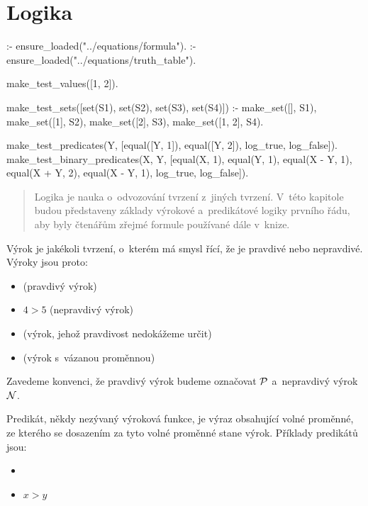 \chapter{Logika}

\begin{prolog}
:- ensure_loaded("../equations/formula").
:- ensure_loaded("../equations/truth_table").

make_test_values([1, 2]).

make_test_sets([set(S1), set(S2), set(S3), set(S4)]) :-
	make_set([], S1),
	make_set([1], S2),
	make_set([2], S3),
	make_set([1, 2], S4).

make_test_predicates(Y, [equal([Y, 1]), equal([Y, 2]), log_true, log_false]).
make_test_binary_predicates(X, Y, [equal(X, 1), equal(Y, 1), equal(X - Y, 1), equal(X + Y, 2), equal(X - Y, 1), log_true, log_false]).
\end{prolog}


\begin{abstract}
Logika je nauka o~odvozování tvrzení z~jiných tvrzení. V~této kapitole budou představeny základy výrokové a~predikátové logiky prvního řádu, aby byly čtenářům zřejmé formule používané dále v~knize.
\end{abstract}

Výrok je jakékoli tvrzení, o~kterém má smysl řící, že je pravdivé nebo nepravdivé. Výroky jsou proto:

\begin{itemize}
	\item {} (pravdivý výrok)
	\item \(4 > 5\) (nepravdivý výrok)
	\item {} (výrok, jehož pravdivost nedokážeme určit)
	\item {} (výrok s~vázanou proměnnou)
\end{itemize}

Zavedeme konvenci, že pravdivý výrok budeme označovat \(\mathcal{P}\) a~nepravdivý výrok \(\mathcal{N}\).

Predikát, někdy nezývaný výroková funkce, je výraz obsahující volné proměnné, ze kterého se dosazením za tyto volné proměnné stane výrok. Příklady predikátů jsou:

\begin{itemize}
	\item {}
	\item \(x > y\)
\end{itemize}


